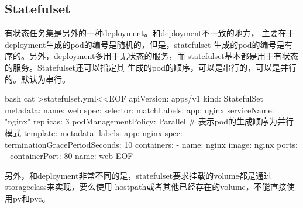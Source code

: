 \subsection{Statefulset}
有状态任务集是另外的一种deployment。和deployment不一致的地方，
主要在于deployment生成的pod的编号是随机的，但是，statefulset
生成的pod的编号是有序的。另外，deployment多用于无状态的服务，而
statefulset基本都是用于有状态的服务。Statefulset还可以指定其
生成的pod的顺序，可以是串行的，可以是并行的。默认为串行。
\begin{code-block}{bash}
cat >statefulset.yml<<EOF
apiVersion: apps/v1
kind: StatefulSet
metadata:
  name: web
spec:
  selector:
    matchLabels:
      app: nginx
  serviceName: "nginx"
  replicas: 3
  podManagementPolicy: Parallel # 表示pod的生成顺序为并行模式
  template:
    metadata:
      labels:
        app: nginx
    spec:
      terminationGracePeriodSeconds: 10
      containers:
      - name: nginx
        image: nginx
        ports:
        - containerPort: 80
          name: web
EOF
\end{code-block}

另外，和deployment非常不同的是，statefulset要求挂载的volume都是通过storageclass来实现，要么使用
hostpath或者其他已经存在的volume，不能直接使用pv和pvc。